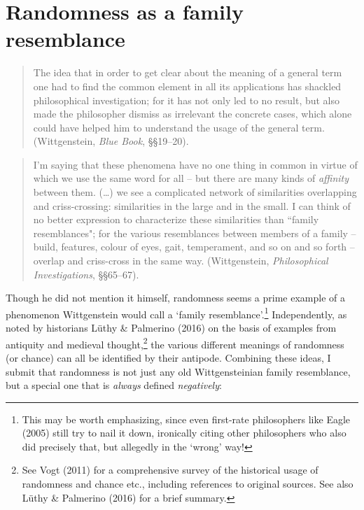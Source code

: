 \documentclass[11pt,a4paper]{article}
\numberwithin{equation}{section}
\begin{document}
\section{Randomness as a family resemblance}\label{RFR}
\begin{quote}\begin{small}
The idea that in order to get clear about the meaning of a general term one had to find the common element in all its applications has shackled philosophical investigation; for it has not only led to no result, but also made the philosopher dismiss as irrelevant the concrete cases, which alone could have helped him to understand the usage of the general term.  (Wittgenstein, \emph{Blue Book},  \S\S 19--20). \end{small}
\end{quote}
\begin{quote}\begin{small}
I'm saying that these phenomena have no one thing in common in virtue of which we use the same word for all -- but there are many kinds of \emph{affinity} between them.  (\ldots) we see a complicated network of similarities overlapping and criss-crossing: 
similarities in the large and in the small. I can think of no better expression to characterize these similarities than ``family resemblances"; for the various resemblances between members of a family -- build, features, colour of eyes, gait, temperament, and so on and so forth -- overlap and criss-cross in the same way.    (Wittgenstein, \emph{Philosophical Investigations}, \S\S 65--67). \end{small}
\end{quote}
Though he did not mention it himself, randomness seems a prime example of a phenomenon Wittgenstein would call a `family resemblance'.\footnote{This may be worth emphasizing, since even first-rate philosophers like Eagle (2005) still try to nail it down, ironically citing other philosophers who also did precisely that, but allegedly in the `wrong' way!} Independently, as 
 noted by historians L\"{u}thy \& Palmerino (2016) on the basis of examples from antiquity and medieval thought,\footnote{See Vogt (2011) for a comprehensive survey of the historical usage of randomness and chance etc., including references to original sources. See also L\"{u}thy \& Palmerino (2016) for a brief summary. }  the various different meanings of randomness (or chance) can all be identified by their antipode. Combining these ideas, I submit that randomness is not just any old Wittgensteinian family resemblance, but a  special one that is \emph{always} defined \emph{negatively}:
\end{document}
